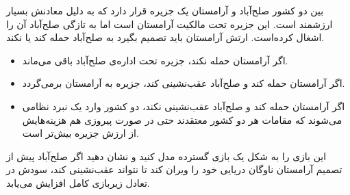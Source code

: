 بین دو کشور صلح‌آباد و آرامستان یک جزیره قرار دارد که به دلیل معادنش بسیار ارزشمند است. این جزیره تحت مالکیت آرامستان است اما به تازگی صلح‌آباد آن را اشغال کرده‌است. ارتش آرامستان باید تصمیم بگیرد به صلح‌آباد حمله کند یا نکند.
\begin{itemize}
    \item اگر آرامستان حمله نکند، جزیره تحت اداره‌ی صلح‌آباد باقی می‌ماند.
    \item اگر آرامستان حمله کند و صلح‌آباد عقب‌نشینی کند، جزیره به آرامستان برمی‌گردد.
    \item اگر آرامستان حمله کند و صلح‌آباد عقب‌نشینی نکند، دو کشور وارد یک نبرد نظامی می‌شوند که مقامات هر دو کشور معتقدند حتی در صورت پیروزی هم هزینه‌هایش از ارزش جزیره بیش‌تر است.
\end{itemize}
این بازی را به شکل یک بازی گسترده مدل کنید و نشان دهید اگر صلح‌آباد پیش از تصمیم آرامستان ناوگان دریایی خود را ویران کند تا نتواند عقب‌نشینی کند، سودش در تعادل زیربازی کامل افزایش می‌یابد.